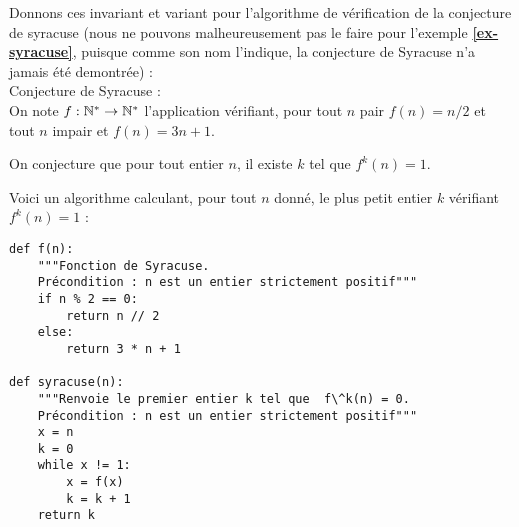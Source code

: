 Donnons ces invariant et variant pour l'algorithme de vérification de la conjecture de syracuse (nous ne 
pouvons malheureusement pas le faire pour l'exemple \textbf{\ref{ex-syracuse}}, puisque comme son 
nom l'indique, la conjecture de Syracuse n'a jamais été demontrée) :\\

Conjecture de Syracuse :\\
On note $f : \mathbb{N}^{*} \to \mathbb{N}^{*}$ l'application vérifiant, pour tout $n$ pair
$f(n)=n/2$ et tout $n$ impair et $f(n)=3n+1$.

On conjecture que pour tout entier $n$, il existe $k$ tel que
$f^{k}(n)=1$.

Voici un algorithme calculant, pour tout $n$ donné, le plus petit
entier $k$ vérifiant $f^{k}(n) = 1$ :

\begin{lstlisting}
def f(n):
    """Fonction de Syracuse.
    Précondition : n est un entier strictement positif"""
    if n % 2 == 0:
        return n // 2
    else:
        return 3 * n + 1
        
def syracuse(n):
    """Renvoie le premier entier k tel que  f\^k(n) = 0.
    Précondition : n est un entier strictement positif"""
    x = n
    k = 0
    while x != 1:
        x = f(x)
        k = k + 1
    return k
\end{lstlisting}

